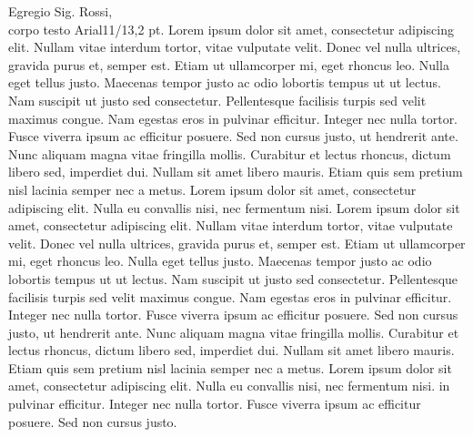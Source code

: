 \documentclass{SISSAletter}
\begin{document}
Egregio Sig. Rossi,
\bigskip \\
corpo testo Arial11/13,2 pt. Lorem ipsum dolor sit amet, consectetur adipiscing elit. Nullam vitae interdum tortor, vitae vulputate velit. Donec vel nulla ultrices, gravida purus et, semper est. Etiam ut ullamcorper mi, eget rhoncus leo. Nulla eget tellus justo. Maecenas tempor justo ac odio lobortis tempus ut ut lectus. Nam suscipit ut justo sed consectetur. Pellentesque facilisis turpis sed velit maximus congue. Nam egestas eros in pulvinar efficitur. Integer nec nulla tortor. Fusce viverra ipsum ac efficitur posuere. Sed non cursus justo, ut hendrerit ante. Nunc aliquam magna vitae fringilla mollis. Curabitur et lectus rhoncus, dictum libero sed, imperdiet dui. Nullam sit amet libero mauris. Etiam quis sem pretium nisl lacinia semper nec a metus. Lorem ipsum dolor sit amet, consectetur adipiscing elit. Nulla eu convallis nisi, nec fermentum nisi. Lorem ipsum dolor sit amet, consectetur adipiscing elit. Nullam vitae interdum tortor, vitae vulputate velit. Donec vel nulla ultrices, gravida purus et, semper est. Etiam ut ullamcorper mi, eget rhoncus leo. Nulla eget tellus justo. Maecenas tempor justo ac odio lobortis tempus ut ut lectus. Nam suscipit ut justo sed consectetur. Pellentesque facilisis turpis sed velit maximus congue. Nam egestas eros in pulvinar efficitur. Integer nec nulla tortor. Fusce viverra ipsum ac efficitur posuere. Sed non cursus justo, ut hendrerit ante. Nunc aliquam magna vitae fringilla mollis. Curabitur et lectus rhoncus, dictum libero sed, imperdiet dui. Nullam sit amet libero mauris. Etiam quis sem pretium nisl lacinia semper nec a metus. Lorem ipsum dolor sit amet, consectetur adipiscing elit. Nulla eu convallis nisi, nec fermentum nisi. in pulvinar efficitur. Integer nec nulla tortor. Fusce viverra ipsum ac efficitur posuere. Sed non cursus justo.
\smallskip \\
\end{document}
